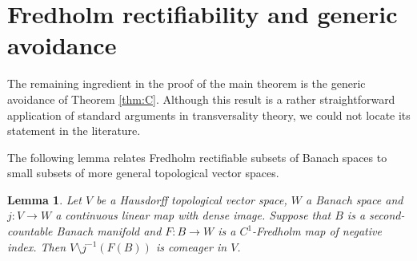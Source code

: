 \documentclass[11pt,a4paper]{article}
\newtheorem{lemma}[theorem]{Lemma}
\theoremstyle{definition}
\begin{document}
\section{Fredholm rectifiability and generic avoidance}

The remaining ingredient in the proof of the main theorem is the generic avoidance of Theorem \ref{thm:C}. Although this result is a rather straightforward application of standard arguments in transversality theory, we could not locate its statement in the literature.

The following lemma relates Fredholm rectifiable subsets of Banach spaces to small subsets of more general topological vector spaces. 

\begin{lemma}\label{Banach to Hausdorff}
  Let $V$ be a Hausdorff topological vector space, $W$ a Banach space and $j: V \to W$ a continuous linear map with dense image. Suppose that $B$ is a second-countable Banach manifold and $F: B \to W$ is a $C^1$-Fredholm map of negative index. Then $V \setminus j^{-1}(F(B))$ is comeager in $V$. 
\end{lemma}
\end{document}
